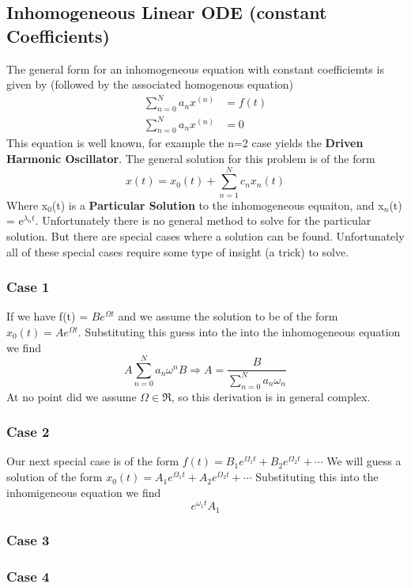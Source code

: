 \documentclass{article}
\newcommand{\be}{\begin{equation}}
\newcommand{\ee}{\end{equation}}
\begin{document}
\subsection*{Inhomogeneous Linear ODE (constant Coefficients)}
The general form for an inhomogeneous equation with constant coefficiemts is given by (followed by the associated homogenous equation)
\be
\begin{split}
	\sum_{n=0}^N a_n x^{(n)} &= f(t)\\
	\sum_{n=0}^N a_n x^{(n)} &= 0
\end{split}
\ee
This equation is well known, for example the n=2 case yields the \textbf{Driven Harmonic Oscillator}.
The general solution for this problem is of the form
\be
x(t) = x_0(t) + \sum_{n=1}^N c_nx_n(t)
\ee
Where x$_0$(t) is a \textbf{Particular Solution} to the inhomogeneous equaiton, and x$_n$(t) = e$^{\lambda_n t}$. 
Unfortunately there is no general method to solve for the particular solution.
But there are special cases where a solution can be found.
Unfortunately all of these special cases require some type of insight (a trick) to solve.

\subsubsection*{Case 1}
If we have f(t) = $Be^{\Omega t}$ and we assume the solution to be of the form $x_0(t) = Ae^{\Omega t}$.
Substituting this guess into the into the inhomogeneous equation we find
\be
A \sum_{n=0}^N a_n \omega^n B \Rightarrow A = \frac{B}{\sum_{n=0}^N a_n \omega_n}
\ee
At no point did we assume $\Omega \in \Re$, so this derivation is in general complex.

\subsubsection*{Case 2}
Our next special case is of the form $f(t) = B_1e^{\Omega_1t} + B_2e^{\Omega_2t} + \cdots$
We will guess a solution of the form $x_0(t) = A_1 e^{\Omega_1t} + A_2 e^{\Omega_2t} + \cdots$
Substituting this into the inhomigeneous equation we find 
\be
e^{\omega_1t} A_1
\ee




\subsubsection*{Case 3}


\subsubsection*{Case 4}
\end{document}
